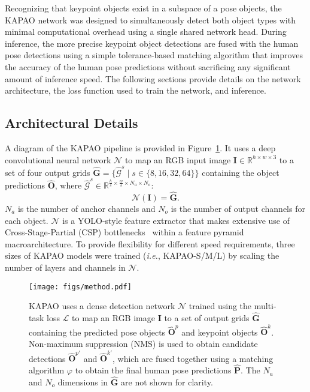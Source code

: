 \documentclass[runningheads]{llncs}
\newcommand{\ie}{\textit{i.e.}}
\begin{document}
Recognizing that keypoint objects exist in a subspace of a pose objects, the KAPAO network was designed to simultaneously detect both object types with minimal computational overhead using a single shared network head. During inference, the more precise keypoint object detections are fused with the human pose detections using a simple tolerance-based matching algorithm that improves the accuracy of the human pose predictions without sacrificing any significant amount of inference speed. The following sections provide details on the network architecture, the loss function used to train the network, and inference.

\subsection{Architectural Details}
\label{sec:kapao_arch}
A diagram of the KAPAO pipeline is provided in Figure~\ref{fig:kapao_method}. It uses a deep convolutional neural network $\mathcal{N}$ to map an RGB input image $\mathbf{I}\in\mathbb{R}^{h\times w\times 3}$ to a set of four output grids $\hat{\mathbf{G}} = \{\hat{\mathcal{G}}^s\mid s\in\{8, 16, 32, 64\}\}$ containing the object predictions $\hat{\mathbf{O}}$, where $\hat{\mathcal{G}}^s\in\mathbb{R}^{\frac{h}{s}\times \frac{w}{s}\times N_a \times N_o}$:
\begin{equation}
    \mathcal{N}(\mathbf{I}) = \hat{\mathbf{G}}.
\end{equation}
$N_a$ is the number of anchor channels and $N_o$ is the number of output channels for each object. $\mathcal{N}$ is a YOLO-style feature extractor that makes extensive use of Cross-Stage-Partial (CSP) bottlenecks~\cite{wang2020cspnet} within a feature pyramid~\cite{lin2017feature} macroarchitecture. To provide flexibility for different speed requirements, three sizes of KAPAO models were trained (\ie, KAPAO-S/M/L) by scaling the number of layers and channels in $\mathcal{N}$. 


\begin{figure}[t]
\centering
    \texttt{[image: figs/method.pdf]}
\caption[Schematic of the KAPAO methodology.]{KAPAO uses a dense detection network $\mathcal{N}$ trained using the multi-task loss $\mathcal{L}$ to map an RGB image $\mathbf{I}$ to a set of output grids $\hat{\mathbf{G}}$ containing the predicted pose objects $\hat{\mathbf{O}}^p$ and keypoint objects $\hat{\mathbf{O}}^k$. Non-maximum suppression (NMS) is used to obtain candidate detections $\hat{\mathbf{O}}^{p\prime}$ and $\hat{\mathbf{O}}^{k\prime}$, which are fused together using a matching algorithm $\varphi$ to obtain the final human pose predictions $\hat{\mathbf{P}}$. The $N_a$ and $N_o$ dimensions in $\hat{\mathbf{G}}$ are not shown for clarity.}
\label{fig:kapao_method}
\end{figure}
\end{document}
